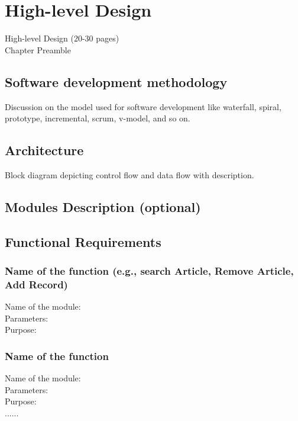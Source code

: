 \chapter{High-level Design}
\graphicspath{{HighLevelDesign/HighLevelDesignFigs/EPS/}{HighLevelDesign/HighLevelDesignFigs/}}

High-level Design (20-30 pages)\\
Chapter Preamble\\

\section{Software development methodology}
Discussion on the model used for software development like waterfall, spiral,
prototype, incremental, scrum, v-model, and so on.
\section{Architecture}
Block diagram depicting control flow and data flow with description.
\section{Modules Description (optional)}
\section{Functional Requirements}
\subsection{Name of the function (e.g., search Article, Remove Article, Add Record)}
Name of the module:\\
Parameters:\\
Purpose:
\subsection{Name of the function}
Name of the module:\\
Parameters:\\
Purpose:\\
......\\





